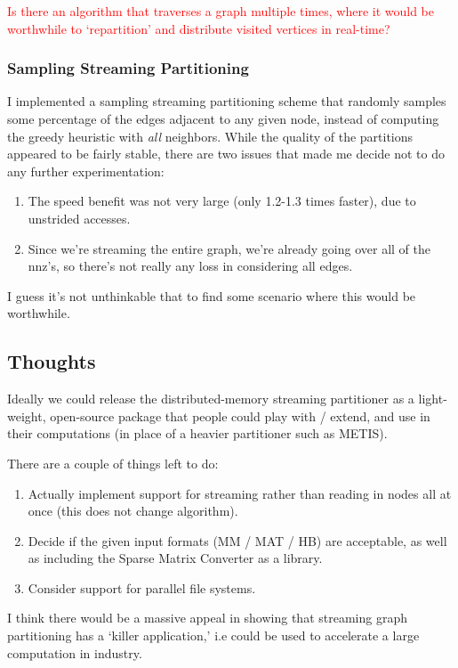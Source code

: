 \documentclass[11pt]{article}
\newcommand\warning[1]{\textcolor{red}{#1}}
\begin{document}
\warning{Is there an algorithm that traverses a graph multiple times, where it would be worthwhile to `repartition' and distribute visited vertices in real-time?}

\subsubsection{Sampling Streaming Partitioning}
I implemented a sampling streaming partitioning scheme that randomly samples some percentage of the edges adjacent to any given node, instead of computing the greedy heuristic with \textit{all} neighbors. While the quality of the partitions appeared to be fairly stable, there are two issues that made me decide not to do any further experimentation:

\begin{enumerate}
\item The speed benefit was not very large (only 1.2-1.3 times faster), due to unstrided accesses. 
\item Since we're streaming the entire graph, we're already going over all of the nnz's, so there's not really any loss in considering all edges. \end{enumerate}

I guess it's not unthinkable that to find some scenario where this would be worthwhile.

\subsection{Thoughts}
Ideally we could release the distributed-memory streaming partitioner as a light-weight, open-source package that people could play with / extend, and use in their computations (in place of a heavier partitioner such as METIS). 

There are a couple of things left to do: 
\begin{enumerate}
\item Actually implement support for streaming rather than reading in nodes all at once (this does not change algorithm).
\item Decide if the given input formats (MM / MAT / HB) are acceptable, as well as including the Sparse Matrix Converter as a library.
\item Consider support for parallel file systems.
\end{enumerate}

I think there would be a massive appeal in showing that streaming graph partitioning has a `killer application,' i.e could be used to accelerate a large computation in industry. 
\end{document}
